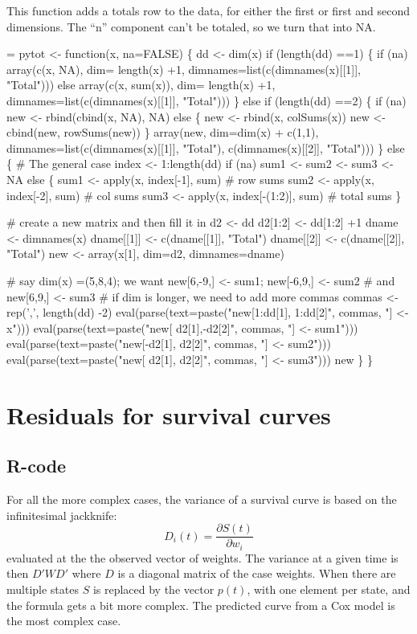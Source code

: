 \documentclass{article}
\begin{document}
This function adds a totals row to the data, for either the first
or first and second dimensions.
The ``n'' component can't be totaled, so we turn that into NA.
\begin{nwchunk}
=
 pytot <- function(x, na=FALSE) \{
     dd <- dim(x)
     if (length(dd) ==1) \{
         if (na) array(c(x, NA), dim= length(x) +1,
                               dimnames=list(c(dimnames(x)[[1]], "Total")))
         else array(c(x, sum(x)), dim= length(x) +1,
                               dimnames=list(c(dimnames(x)[[1]], "Total")))
     \}
     else if (length(dd) ==2) \{
         if (na) new <- rbind(cbind(x, NA), NA)
         else \{
             new <- rbind(x, colSums(x))
             new <- cbind(new, rowSums(new))
             \}
         array(new, dim=dim(x) + c(1,1), 
               dimnames=list(c(dimnames(x)[[1]], "Total"),
                             c(dimnames(x)[[2]], "Total")))
     \}
     else \{
         # The general case
         index <- 1:length(dd)
         if (na) sum1 <- sum2 <- sum3 <- NA
         else \{
             sum1 <- apply(x, index[-1], sum)    # row sums
             sum2 <- apply(x, index[-2], sum)    # col sums
             sum3 <- apply(x, index[-(1:2)], sum) # total sums
             \}
         
         # create a new matrix and then fill it in
         d2 <- dd
         d2[1:2] <- dd[1:2] +1
         dname <- dimnames(x)
         dname[[1]] <- c(dname[[1]], "Total")
         dname[[2]] <- c(dname[[2]], "Total")
         new <- array(x[1], dim=d2, dimnames=dname)
 
         # say dim(x) =(5,8,4); we want new[6,-9,] <- sum1; new[-6,9,] <- sum2
         #  and new[6,9,] <- sum3
         # if dim is longer, we need to add more commas
         commas <- rep(',', length(dd) -2)
         eval(parse(text=paste("new[1:dd[1], 1:dd[2]", commas, "] <- x")))
         eval(parse(text=paste("new[ d2[1],-d2[2]", commas, "] <- sum1")))
         eval(parse(text=paste("new[-d2[1], d2[2]", commas, "] <- sum2")))
         eval(parse(text=paste("new[ d2[1], d2[2]", commas, "] <- sum3")))
         new
     \}
 \}
\end{nwchunk}
\section{Residuals for survival curves}
\subsection{R-code}
For all the more complex cases, the variance of a survival curve is based on 
the infinitesimal jackknife:
$$
D_i(t) = \frac{\partial S(t)}{\partial w_i}
$$
evaluated at the the observed vector of weights.  The variance at a given 
time is then  $D'WD'$ where $D$ is a diagonal matrix of the case weights.
When there are multiple states $S$ is replaced by the vector $p(t)$, with
one element per state, and the formula gets a bit more complex.
The predicted curve from a Cox model is the most complex case.
\end{document}
